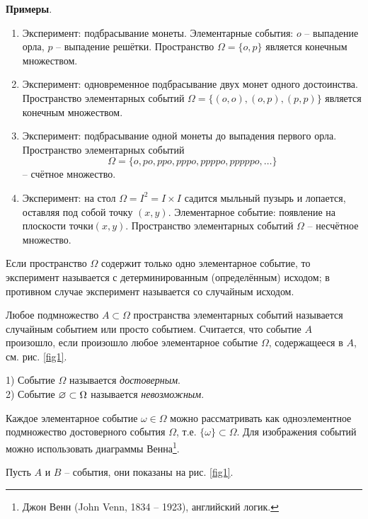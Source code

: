 \textbf{Примеры}. 
\begin{enumerate}
	\item Эксперимент: подбрасывание монеты. Элементарные события: $o$ -- выпадение орла, $p$ -- выпадение решётки. Пространство $\Omega=\{o,p\}$ является конечным множеством.
	\item Эксперимент: одновременное подбрасывание двух монет одного достоинства. Пространство элементарных событий $\Omega=\{(o,o),(o,p),(p,p)\}$ является конечным множеством.
	\item Эксперимент: подбрасывание одной монеты до выпадения первого орла. Пространство элементарных событий $$\Omega=\{o, po, ppo, pppo, ppppo, pppppo, \ldots\}$$ -- счётное множество.
	\item Эксперимент: на стол $\Omega=I^2=I\times I$ садится мыльный пузырь и лопается, оставляя под собой точку $(x, y)$. Элементарное событие: появление на плоскости точки$ (x, y)$. Пространство элементарных событий $\Omega$ -- несчётное
множество.
\end{enumerate}


\begin{definition}
	Если пространство $\Omega$ содержит только одно элементарное событие, то эксперимент называется с детерминированным (определённым) исходом; в противном случае эксперимент называется со случайным исходом.
\end{definition}

\begin{definition} Любое подмножество $A\subset\Omega$ пространства элементарных событий называется случайным событием или просто событием. Считается, что событие $A$ произошло, если произошло любое элементарное событие $\Omega$, содержащееся в $A$, см. рис. \ref{fig1}.
\end{definition}
\begin{definition}
	1) Событие $\Omega$ называется \textit{достоверным}.\\
	2) Событие $\varnothing\subset\Omega$ называется \textit{невозможным}.
\end{definition}

Каждое элементарное событие $\omega\in\Omega$ можно рассматривать как одноэлементное подмножество достоверного события $\Omega$, т.е. $\{\omega\}\subset\Omega$. Для изображения событий можно использовать диаграммы Венна\footnote{Джон Венн (John Venn, 1834 -- 1923), английский логик.}.

Пусть $A$ и $B$ -- события, они показаны на рис. \ref{fig1}.

